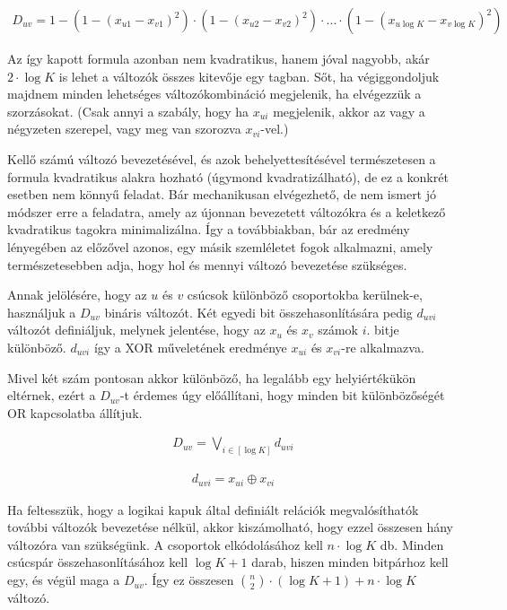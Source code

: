 \begin{align}	
	D_{uv} = 1-  \left( 1-(x_{u1}-x_{v1})^2 \right) \cdot \left( 1-(x_{u2}-x_{v2})^2 \right) \cdot ...  \cdot \left( 1-(x_{u\log K}-x_{v \log K})^2 \right) 
\end{align}

Az így kapott formula azonban nem kvadratikus, hanem jóval nagyobb, akár $2 \cdot \log K$ is lehet a változók összes kitevője egy tagban. Sőt, ha végiggondoljuk majdnem minden lehetséges változókombináció megjelenik, ha elvégezzük a szorzásokat. (Csak annyi a szabály, hogy ha $x_{ui}$ megjelenik, akkor az vagy a négyzeten szerepel, vagy meg van szorozva $x_{vi}$-vel.)

Kellő számú változó bevezetésével, és azok behelyettesítésével természetesen a formula kvadratikus alakra hozható (úgymond kvadratizálható), de ez a konkrét esetben nem könnyű feladat. Bár mechanikusan elvégezhető, de nem ismert jó módszer erre a feladatra, amely az újonnan bevezetett változókra és a keletkező kvadratikus tagokra minimalizálna. Így a továbbiakban, bár az eredmény lényegében az előzővel azonos, egy másik szemléletet fogok alkalmazni, amely természetesebben adja, hogy hol és mennyi változó bevezetése szükséges.


Annak jelölésére, hogy az $u$ és $v$ csúcsok különböző csoportokba kerülnek-e, használjuk a $D_{uv}$ bináris változót. Két egyedi bit összehasonlítására pedig $d_{uvi}$ változót definiáljuk, melynek jelentése, hogy az $x_u$ és $x_v$ számok $i.$ bitje különböző. $d_{uvi}$ így a XOR műveletének eredménye $x_{ui}$ és  $x_{vi}$-re alkalmazva.

Mivel két szám pontosan akkor különböző, ha legalább egy helyiértékükön eltérnek, ezért a $D_{uv}$-t érdemes úgy előállítani, hogy minden bit különbözőségét OR kapcsolatba állítjuk.

\begin{align}
	D_{uv} = \bigvee_{i \in [ \log K ] }{d_{uvi}}
\end{align}

\begin{align}
	d_{uvi} = x_{ui} \oplus x_{vi}
\end{align}

Ha feltesszük, hogy a logikai kapuk által definiált relációk megvalósíthatók további változók bevezetése nélkül, akkor kiszámolható, hogy ezzel összesen hány változóra van szükségünk. A csoportok elkódolásához kell $n \cdot \log K$ db. Minden csúcspár összehasonlításához kell $\log K + 1$ darab, hiszen minden bitpárhoz kell egy, és végül maga a $D_{uv}$. Így ez összesen $\binom{n}{2} \cdot ( \log K + 1 ) + n \cdot \log K$ változó.


